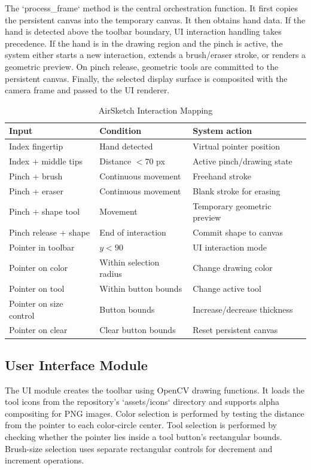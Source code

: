 \documentclass[conference]{IEEEtran}
\begin{document}
The `process\_frame` method is the central orchestration function. It first copies the persistent canvas into the temporary canvas. It then obtains hand data. If the hand is detected above the toolbar boundary, UI interaction handling takes precedence. If the hand is in the drawing region and the pinch is active, the system either starts a new interaction, extends a brush/eraser stroke, or renders a geometric preview. On pinch release, geometric tools are committed to the persistent canvas. Finally, the selected display surface is composited with the camera frame and passed to the UI renderer.


\begin{table}[t]
\caption{AirSketch Interaction Mapping}
\label{tab:interaction}
\centering
\scriptsize
\begin{tabular}{p{1.45cm}p{1.65cm}p{2.55cm}}
\toprule
\textbf{Input} & \textbf{Condition} & \textbf{System action}\\
\midrule
Index fingertip & Hand detected & Virtual pointer position\\
Index + middle tips & Distance $<70$ px & Active pinch/drawing state\\
Pinch + brush & Continuous movement & Freehand stroke\\
Pinch + eraser & Continuous movement & Blank stroke for erasing\\
Pinch + shape tool & Movement & Temporary geometric preview\\
Pinch release + shape & End of interaction & Commit shape to canvas\\
Pointer in toolbar & $y<90$ & UI interaction mode\\
Pointer on color & Within selection radius & Change drawing color\\
Pointer on tool & Within button bounds & Change active tool\\
Pointer on size control & Button bounds & Increase/decrease thickness\\
Pointer on clear & Clear button bounds & Reset persistent canvas\\
\bottomrule
\end{tabular}
\end{table}

\subsection{User Interface Module}
The UI module creates the toolbar using OpenCV drawing functions. It loads the tool icons from the repository's `assets/icons` directory and supports alpha compositing for PNG images. Color selection is performed by testing the distance from the pointer to each color-circle center. Tool selection is performed by checking whether the pointer lies inside a tool button's rectangular bounds. Brush-size selection uses separate rectangular controls for decrement and increment operations.
\end{document}

